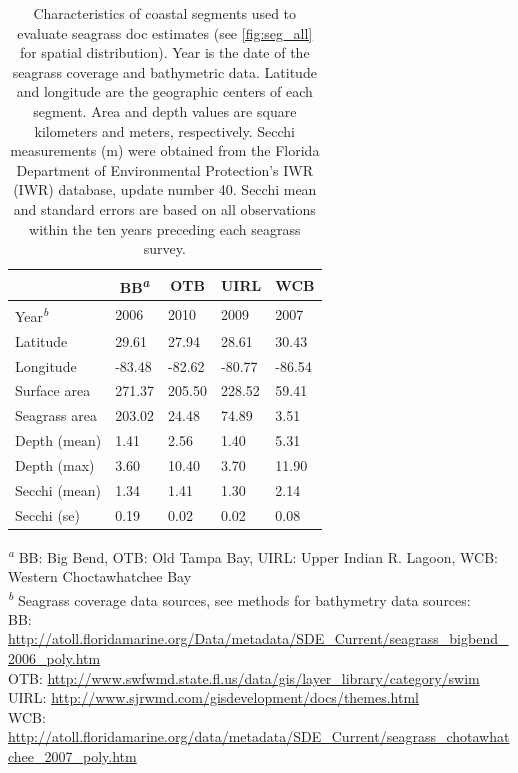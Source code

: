 \documentclass[letterpaper,12pt,oneside]{article}\usepackage[]{graphicx}\usepackage[]{color}
\begin{document}











\begin{table}[!tbp]
\caption{Characteristics of coastal segments used to evaluate seagrass \acl{doc} estimates (see \cref{fig:seg_all} for spatial distribution).  Year is the date of the seagrass coverage and bathymetric data.  Latitude and longitude are the geographic centers of each segment.  Area and depth values are square kilometers and meters, respectively.  Secchi measurements (m) were obtained from the Florida Department of Environmental Protection's \acl{IWR} (\acs{IWR}) database, update number 40.  Secchi mean and standard errors are based on all observations within the ten years preceding each seagrass survey.\label{tab:seg_summ}} 
\begin{center}
\begin{tabular}{lllll}
\hline\hline
\multicolumn{1}{l}{}&\multicolumn{1}{c}{BB\textsuperscript{\textit{a}}}&\multicolumn{1}{c}{OTB}&\multicolumn{1}{c}{UIRL}&\multicolumn{1}{c}{WCB}\tabularnewline
\hline
Year\textsuperscript{\textit{b}}&2006&2010&2009&2007\tabularnewline
Latitude& 29.61& 27.94& 28.61& 30.43\tabularnewline
Longitude&-83.48&-82.62&-80.77&-86.54\tabularnewline
Surface area&271.37&205.50&228.52& 59.41\tabularnewline
Seagrass area&203.02& 24.48& 74.89&  3.51\tabularnewline
Depth (mean)&  1.41&  2.56&  1.40&  5.31\tabularnewline
Depth (max)&  3.60& 10.40&  3.70& 11.90\tabularnewline
Secchi (mean)&  1.34&  1.41&  1.30&  2.14\tabularnewline
Secchi (se)&  0.19&  0.02&  0.02&  0.08\tabularnewline
\hline
\end{tabular}\end{center}
\footnotesize \textsuperscript{\textit{a}} BB: Big Bend, OTB: Old Tampa Bay, UIRL: Upper Indian R. Lagoon, WCB: Western Choctawhatchee Bay\\\textsuperscript{\textit{b}} Seagrass coverage data sources, see methods for bathymetry data sources:\scriptsize\\BB: \url{http://atoll.floridamarine.org/Data/metadata/SDE_Current/seagrass_bigbend_2006_poly.htm}\\OTB: \url{http://www.swfwmd.state.fl.us/data/gis/layer_library/category/swim}\\UIRL: \url{http://www.sjrwmd.com/gisdevelopment/docs/themes.html}\\WCB: \url{http://atoll.floridamarine.org/data/metadata/SDE_Current/seagrass_chotawhatchee_2007_poly.htm}\end{table}
\end{document}
